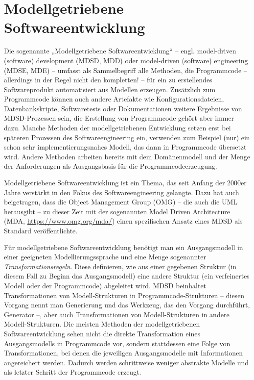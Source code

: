 \section{Modellgetriebene Softwareentwicklung}

Die sogenannte „Modellgetriebene Softwareentwicklung“ – engl. model-driven (software) development (MDSD, MDD) oder model-driven (software) engineering (MDSE, MDE) – umfasst als Sammelbegriff alle Methoden, die Programmcode – allerdings in der Regel nicht den kompletten! –  für ein zu erstellendes Softwareprodukt automatisiert aus Modellen erzeugen. Zusätzlich zum Programmcode können auch andere Artefakte wie Konfigurationsdateien, Datenbankskripte, Softwaretests oder Dokumentationen weitere Ergebnisse von MDSD-Prozessen sein, die Erstellung von Programmcode gehört aber immer dazu. Manche Methoden der modellgetriebenen Entwicklung setzen erst bei späteren Prozessen des Softwareengineering ein, verwenden zum Beispiel (nur) ein schon sehr implementierungsnahes Modell, das dann in Programmcode übersetzt wird. Andere Methoden arbeiten bereits mit dem Domänenmodell und der Menge der Anforderungen als Ausgangsbasis für die Programmcodeerzeugung.

Modellgetriebene Softwareentwicklung ist ein Thema, das seit Anfang der 2000er Jahre verstärkt in den Fokus des Softwareengineering gelangte. Dazu hat auch beigetragen, dass die Object Management Group (OMG) – die auch die UML herausgibt – zu dieser Zeit mit der sogenannten Model Driven Architecture 
(MDA, \url{https://www.omg.org/mda/}) einen spezifischen Ansatz eines MDSD als Standard veröffentlichte.

Für modellgetriebene Softwareentwicklung benötigt man ein Ausgangsmodell in einer geeigneten Modellierungssprache und eine Menge sogenannter \textit{Transformationsregeln}. 
Diese definieren, wie aus einer gegebenen Struktur (in diesem Fall zu Beginn das Ausgangsmodell) eine andere Struktur (ein verfeinertes Modell oder der Programmcode) abgeleitet wird. MDSD beinhaltet Transformationen von Modell-Strukturen in Programmcode-Strukturen – diesen Vorgang nennt man Generierung und das Werkzeug, das den Vorgang durchführt, Generator –, aber auch Transformationen von Modell-Strukturen in andere Modell-Strukturen. Die meisten Methoden der modellgetriebenen Softwareentwicklung sehen nicht die direkte Transformation eines Ausgangsmodells in Programmcode vor, sondern stattdessen eine Folge von Transformationen, bei denen die jeweiligen Ausgangsmodelle mit Informationen angereichert werden. Dadurch werden schrittweise weniger abstrakte Modelle und als letzter Schritt der Programmcode erzeugt.

